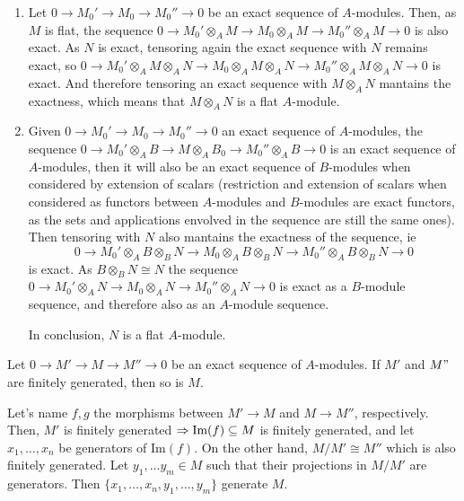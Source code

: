 \begin{sol}
	\begin{enumerate}[label=(\roman*)]
		\item Let $0 \to M_0' \to M_0 \to M_0'' \to 0$ be an exact sequence of $A$-modules. Then, as $M$ is flat, the sequence $0 \to M_0' \otimes_A M \to M_0 \otimes_A M \to M_0'' \otimes_A M \to 0$ is also exact. As $N$ is exact, tensoring again the exact sequence with $N$ remains exact, so $0 \to M_0' \otimes_A M \otimes_A N \to M_0 \otimes_A M \otimes_A N \to M_0'' \otimes_A M \otimes_A N \to 0$ is exact. And therefore tensoring an exact sequence with $M \otimes_A N$ mantains the exactness, which means that $M \otimes_A N$ is a flat $A$-module.

		\item Given $0 \to M_0' \to M_0 \to M_0'' \to 0$ an exact sequence of $A$-modules, the sequence $0 \to M_0' \otimes_A B \to M \otimes_A B_0 \to M_0'' \otimes_A B \to 0$ is an exact sequence of $A$-modules, then it will also be an exact sequence of $B$-modules when considered by extension of scalars (restriction and extension of scalars when considered as functors between $A$-modules and $B$-modules are exact functors, as the sets and applications envolved in the sequence are still the same ones). Then tensoring with $N$ also mantains the exactness of the sequence, ie
		\[
			0 \to M_0' \otimes_A B \otimes_B N \to M_0 \otimes_A B \otimes_B N \to M_0'' \otimes_A B \otimes_B N \to 0
		\] 
		is exact. As $B \otimes_B N \cong N$ the sequence $0 \to M_0' \otimes_A N \to M_0 \otimes_A N \to M_0'' \otimes_A N \to 0$ is exact as a $B$-module sequence, and therefore also as an $A$-module sequence.

		In conclusion, $N$ is a flat $A$-module.
	\end{enumerate}
\end{sol}

\begin{ex}
	Let $0 \to M' \to M \to M'' \to 0$ be an exact sequence of $A$-modules. If $M'$ and $M"$ are finitely generated, then so is $M$.
\end{ex}

\begin{sol}
	Let's name $f,g$ the morphisms between $M' \to M$ and $M \to M''$, respectively. Then, $M'$ is finitely generated $\Rightarrow \text{Im}(f) \subseteq M$ is finitely generated, and let $x_1, \dots, x_n$ be generators of $\text{Im}(f)$. On the other hand, $M/M' \cong M''$ which is also finitely generated. Let $y_1, \dots y_m \in M$ such that their projections in $M/M'$ are generators. Then $\{x_1, \dots, x_n, y_1, \dots, y_m \}$ generate $M$. %
\end{sol}

